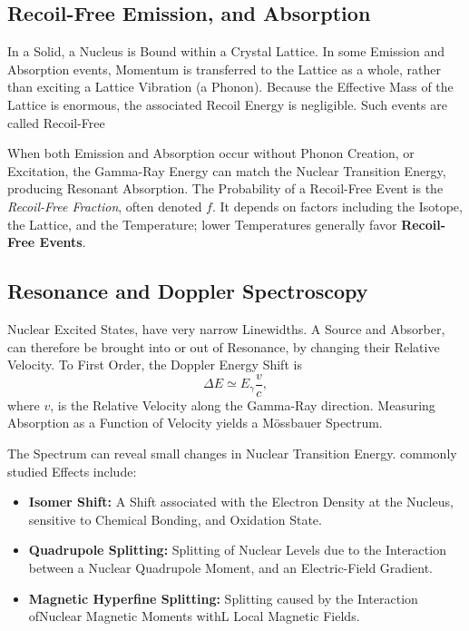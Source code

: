 \documentclass[a4paper, 10pt, onepage]{elegantbook}
\begin{document}
{\subsection{Recoil-Free Emission, and Absorption}

In a Solid, a Nucleus is Bound within a Crystal Lattice. In some Emission and Absorption events, Momentum is 
transferred to the Lattice as a whole, rather than exciting a Lattice Vibration (a Phonon). Because the Effective Mass 
of the Lattice is enormous, the associated Recoil Energy is negligible. Such events are called Recoil-Free  

When both Emission and Absorption occur without Phonon Creation, or Excitation, the Gamma-Ray Energy can match the 
Nuclear Transition Energy, producing Resonant Absorption. The Probability of a Recoil-Free Event is the 
\emph{Recoil-Free Fraction}, often denoted
$f$. It depends on factors including the Isotope, the Lattice, and the Temperature; lower Temperatures generally favor 
\textbf{Recoil-Free Events}.  

\subsection{Resonance and Doppler Spectroscopy}

Nuclear Excited States, have very narrow  Linewidths. A Source
and Absorber, can therefore be brought into or out of Resonance, by
changing their Relative Velocity. To First Order, the Doppler Energy
Shift is  
\begin{equation}
  \Delta E \simeq E_\gamma\frac{v}{c},
\end{equation}
where $v$, is the Relative Velocity along the Gamma-Ray direction.
Measuring Absorption as a Function of Velocity yields a M\"ossbauer Spectrum.  

The Spectrum can reveal small changes in Nuclear Transition Energy. commonly studied Effects include:  
\begin{itemize}
  \item \textbf{Isomer Shift:} A Shift associated with the Electron
        Density at the Nucleus, sensitive to Chemical Bonding, and
        Oxidation State.
  \item \textbf{Quadrupole Splitting:} Splitting of Nuclear Levels due
        to the Interaction between a Nuclear Quadrupole Moment, and an
        Electric-Field Gradient.
  \item \textbf{Magnetic Hyperfine Splitting:} Splitting caused by the
        Interaction ofNuclear Magnetic Moments withL Local Magnetic
        Fields.
\end{itemize}

}
\end{document}
